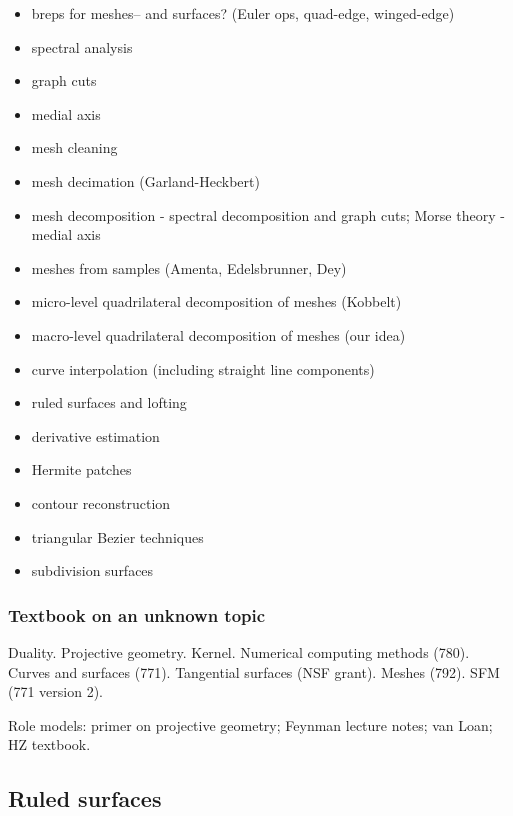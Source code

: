 \documentclass[11pt]{article}
\begin{document}
\begin{itemize}
\item breps for meshes-- and surfaces? (Euler ops, quad-edge, winged-edge)
\item spectral analysis
\item graph cuts
\item medial axis

\item mesh cleaning
\item mesh decimation (Garland-Heckbert)
\item mesh decomposition
  - spectral decomposition and graph cuts; Morse theory
  - medial axis
\item meshes from samples (Amenta, Edelsbrunner, Dey)
\item micro-level quadrilateral decomposition of meshes (Kobbelt)
\item macro-level quadrilateral decomposition of meshes (our idea)
\item curve interpolation (including straight line components)
\item ruled surfaces and lofting
\item derivative estimation
\item Hermite patches
\item contour reconstruction
\item triangular Bezier techniques
\item subdivision surfaces
\end{itemize}


\subsubsection{Textbook on an unknown topic}

Duality.
Projective geometry.
Kernel.
Numerical computing methods (780).
Curves and surfaces (771).
Tangential surfaces (NSF grant).
Meshes (792).
SFM (771 version 2).

Role models: primer on projective geometry; Feynman lecture notes; van Loan; HZ textbook.


\subsection{Ruled surfaces}
\end{document}
